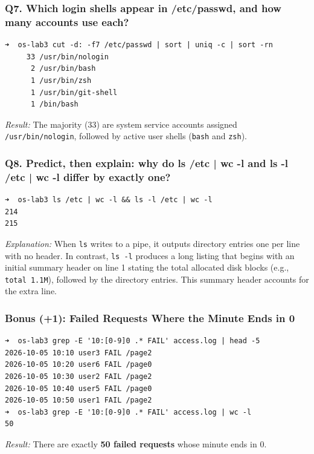 \documentclass{labreport}
\begin{document}
\subsubsection*{Q7. Which login shells appear in /etc/passwd, and how many accounts use each?}
\begin{lstlisting}[style=bash]
➜  os-lab3 cut -d: -f7 /etc/passwd | sort | uniq -c | sort -rn
     33 /usr/bin/nologin
      2 /usr/bin/bash
      1 /usr/bin/zsh
      1 /usr/bin/git-shell
      1 /bin/bash
\end{lstlisting}
\textit{Result:} The majority (33) are system service accounts assigned \texttt{/usr/bin/nologin}, followed by active user shells (\texttt{bash} and \texttt{zsh}).

\subsubsection*{Q8. Predict, then explain: why do ls /etc | wc -l and ls -l /etc | wc -l differ by exactly one?}
\begin{lstlisting}[style=bash]
➜  os-lab3 ls /etc | wc -l && ls -l /etc | wc -l
214
215
\end{lstlisting}
\textit{Explanation:} When \texttt{ls} writes to a pipe, it outputs directory entries one per line with no header. In contrast, \texttt{ls -l} produces a long listing that begins with an initial summary header on line 1 stating the total allocated disk blocks (e.g., \texttt{total 1.1M}), followed by the directory entries. This summary header accounts for the extra line.

\subsubsection*{Bonus (+1): Failed Requests Where the Minute Ends in 0}
\begin{lstlisting}[style=bash]
➜  os-lab3 grep -E '10:[0-9]0 .* FAIL' access.log | head -5
2026-10-05 10:10 user3 FAIL /page2
2026-10-05 10:20 user6 FAIL /page0
2026-10-05 10:30 user2 FAIL /page2
2026-10-05 10:40 user5 FAIL /page0
2026-10-05 10:50 user1 FAIL /page2
➜  os-lab3 grep -E '10:[0-9]0 .* FAIL' access.log | wc -l
50
\end{lstlisting}
\textit{Result:} There are exactly \textbf{50 failed requests} whose minute ends in 0.
\end{document}
